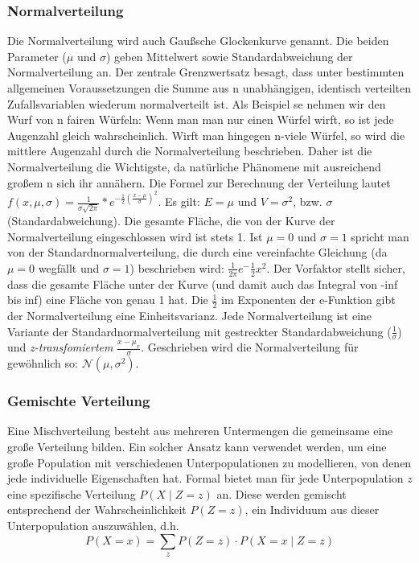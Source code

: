 \documentclass[letterpaper, titlepage]{article}
\begin{document}
\subsubsection{Normalverteilung}\label{Normalverteilung}
Die Normalverteilung wird auch Gaußsche Glockenkurve genannt. Die beiden Parameter ($\mu$  und $\sigma$) geben Mittelwert sowie Standardabweichung der Normalverteilung an. Der zentrale Grenzwertsatz besagt, dass unter bestimmten allgemeinen Voraussetzungen die Summe aus n unabhängigen, identisch verteilten Zufallsvariablen wiederum normalverteilt ist. Als Beispiel se nehmen wir den Wurf von n fairen Würfeln: Wenn man man nur einen Würfel wirft, so ist jede Augenzahl gleich wahrscheinlich. Wirft man hingegen n-viele Würfel, so wird die mittlere Augenzahl durch die Normalverteilung beschrieben. Daher ist die Normalverteilung die Wichtigste, da natürliche Phänomene mit ausreichend großem n sich ihr annähern. Die Formel zur Berechnung der Verteilung lautet \textit{$f(x,\mu, \sigma)=\frac{1}{\sigma\sqrt{2\pi}}*e^{-\frac{1}{2}(\frac{x-\mu}{\sigma})^2}$}. Es gilt: $E=\mu$ und $V=\sigma^2$, bzw. $\sigma$ (Standardabweichung). Die gesamte Fläche, die von der Kurve der Normalverteilung eingeschlossen wird ist stets 1. Ist $\mu=0$ und $\sigma=1$ spricht man von der Standardnormalverteilung, die durch eine vereinfachte Gleichung (da $\mu=0$ wegfällt und $\sigma=1$) beschrieben wird: $\frac{1}{2\pi}e^-\frac{1}{2}x^2$. Der Vorfaktor stellt sicher, dass die gesamte Fläche unter der Kurve (und damit auch das Integral von -inf bis inf) eine Fläche von genau 1 hat. Die $\frac{1}{2}$ im Exponenten der e-Funktion gibt der Normalverteilung eine Einheitsvarianz. Jede Normalverteilung ist eine Variante der Standardnormalverteilung mit gestreckter Standardabweichung ($\frac{1}{\sigma}$) und \textit{z-transfomiertem} $\frac{x-\mu_x}{\sigma}$. Geschrieben wird die Normalverteilung für gewöhnlich so: $\mathcal{N}(\mu, \sigma^2)$. 

\vspace{0.35cm}

\subsubsection{Gemischte Verteilung}\label{Gemischte Verteilung}
Eine Mischverteilung besteht aus mehreren Untermengen die gemeinsame eine große Verteilung bilden. Ein solcher Ansatz kann verwendet werden, um eine große Population mit verschiedenen Unterpopulationen zu modellieren, von denen jede individuelle Eigenschaften hat. Formal bietet man für jede Unterpopulation $z$ eine spezifische Verteilung $P(X\mid Z=z)$ an. Diese werden gemischt entsprechend der Wahrscheinlichkeit $P(Z=z)$, ein Individuum aus dieser Unterpopulation auszuwählen, d.h. $$P(X=x) = \sum_{z}P(Z=z)\cdot P(X=x\mid Z=z)$$
\vspace{0.35cm}
\end{document}
